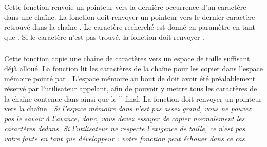 \subsubsection*{}

\noindent Cette fonction renvoie un pointeur vers la dernière occurrence d'un caractère dans une chaîne.
La fonction doit renvoyer un pointeur vers le dernier caractère retrouvé dans la chaîne .
Le caractère recherché est donné en paramètre en tant que .
Si le caractère n'est pas trouvé, la fonction doit renvoyer .


\subsubsection*{}

\noindent Cette fonction copie une chaîne de caractères vers un espace de taille suffisant déjà alloué.
La fonction lit les caractères de la chaîne  pour les copier dans l'espace mémoire pointé par .
L'espace mémoire au bout de  doit avoir été préalablement réservé par l'utilisateur appelant, afin de pouvoir y mettre tous les caractères de la chaîne contenue dans  ainsi que le '' final.
La fonction doit renvoyer un pointeur vers la chaîne .
\textit{Si l'espace mémoire dans  n'est pas assez grand, vous ne pouvez pas le savoir à l'avance, donc, vous devez essayer de copier normalement les caractères dedans. Si l'utilisateur ne respecte l'exigence de taille, ce n'est pas votre faute en tant que développeur : votre fonction peut échouer dans ce cas.}
